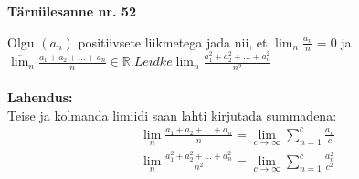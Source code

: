 \documentclass{article}
\begin{document}
\begin{center}
\Large\textbf{T\"arn\"ulesanne nr. 52}\\
\end{center}
Olgu $(a_n)$ positiivsete liikmetega jada nii, et $\displaystyle\lim_n \frac{a_n}{n}=0$ ja\\ $\displaystyle\overline\lim_n \frac{a_1+a_2+...+a_n}{n}\in\mathbb{R}. Leidke \displaystyle\lim_n \frac{a_1^2+a_2^2+...+a_n^2}{n^2}$\\\\
\textbf{Lahendus:}\\
Teise ja kolmanda limiidi saan lahti kirjutada summadena:
\begin{equation*}
\begin{aligned}
\lim_n \frac{a_1+a_2+...+a_n}{n}=\lim_{c\to\infty} \sum_{n=1}^c \frac{a_n}{c}\\
\lim_n \frac{a_1^2+a_2^2+...+a_n^2}{n^2}=\lim_{c\to\infty} \sum_{n=1}^c \frac{a_n^2}{c^2}
\end{aligned}
\end{equation*}
\end{document}
